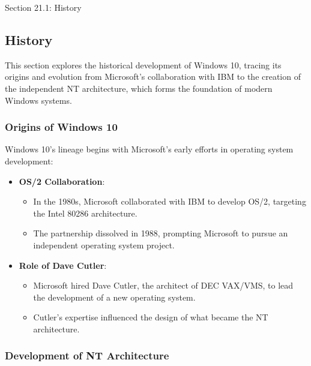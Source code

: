 \begin{notes}{Section 21.1: History}
    \subsection*{History}

    This section explores the historical development of Windows 10, tracing its origins and evolution from Microsoft's collaboration with IBM to the creation of the independent NT architecture, which 
    forms the foundation of modern Windows systems.
    
    \subsubsection*{Origins of Windows 10}
    
    Windows 10's lineage begins with Microsoft's early efforts in operating system development:
    \begin{itemize}
        \item \textbf{OS/2 Collaboration}:
        \begin{itemize}
            \item In the 1980s, Microsoft collaborated with IBM to develop OS/2, targeting the Intel 80286 architecture.
            \item The partnership dissolved in 1988, prompting Microsoft to pursue an independent operating system project.
        \end{itemize}
        \item \textbf{Role of Dave Cutler}:
        \begin{itemize}
            \item Microsoft hired Dave Cutler, the architect of DEC VAX/VMS, to lead the development of a new operating system.
            \item Cutler's expertise influenced the design of what became the NT architecture.
        \end{itemize}
    \end{itemize}
    
    \subsubsection*{Development of NT Architecture}
    

\end{notes}
